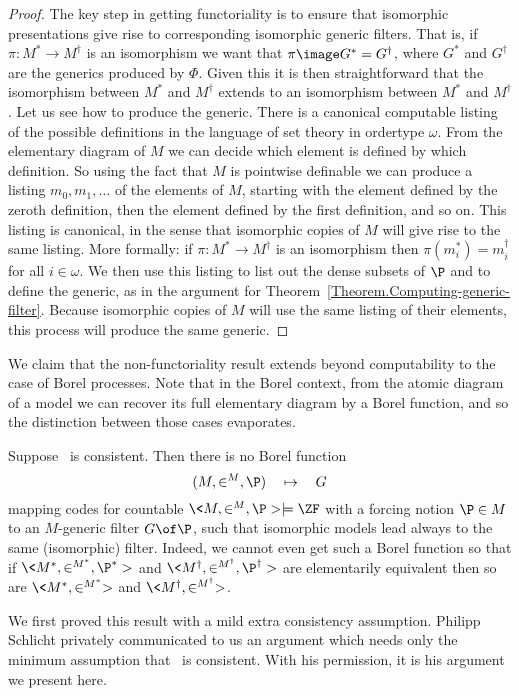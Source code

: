 \documentclass{amsart}
\begin{document}
\begin{proof}
The key step in getting functoriality is to ensure that isomorphic presentations give rise to corresponding isomorphic generic filters. That is, if $\pi : M^* \to M^\dagger$ is an isomorphism we want that $\pi\image G^* = G^\dagger$, where $G^*$ and $G^\dagger$ are the generics produced by $\Phi$. Given this it is then straightforward that the isomorphism between $M^*$ and $M^\dagger$ extends to an isomorphism between $M^*$ and $M^\dagger$.
Let us see how to produce the generic. There is a canonical computable listing of the possible definitions in the language of set theory in ordertype $\omega$. From the elementary diagram of $M$ we can decide which element is defined by which definition. So using the fact that $M$ is pointwise definable we can produce a listing $m_0, m_1, \ldots$ of the elements of $M$, starting with the element defined by the zeroth definition, then the element defined by the first definition, and so on. This listing is canonical, in the sense that isomorphic copies of $M$ will give rise to the same listing. More formally: if $\pi : M^* \to M^\dagger$ is an isomorphism then $\pi(m_i^*) = m_i^\dagger$ for all $i \in \omega$. We then use this listing to list out the dense subsets of $\P$ and to define the generic, as in the argument for Theorem~\ref{Theorem.Computing-generic-filter}. Because isomorphic copies of $M$ will use the same listing of their elements, this process will produce the same generic.
\end{proof}
We claim that the non-functoriality result extends beyond computability to the case of Borel processes. Note that in the Borel context, from the atomic diagram of a model we can recover its full elementary diagram by a Borel function, and so the distinction between those cases evaporates.
\begin{theorem}\label{thm:Borel}
Suppose \ZF\ is consistent. Then there is no Borel function
$$(M,\in^M,\P)\quad\mapsto\quad G$$
mapping codes for countable $\<M,\in^M,\P> \models \ZF$ with a forcing notion $\P\in M$ to an $M$-generic filter $G\of\P$, such that isomorphic models lead always to the same (isomorphic) filter. Indeed, we cannot even get such a Borel function so that if $\<M^*,\in^{M^*},\P^*>$ and $\<M^\dagger,\in^{M^\dagger},\P^\dagger>$ are elementarily equivalent then so are $\<M^*,\in^{M^*}>$ and $\<M^\dagger,\in^{M^\dagger}>$.
\end{theorem}
We first proved this result with a mild extra consistency assumption. Philipp Schlicht privately communicated to us an argument which needs only the minimum assumption that \ZF\ is consistent. With his permission, it is his argument we present here.
\end{document}
